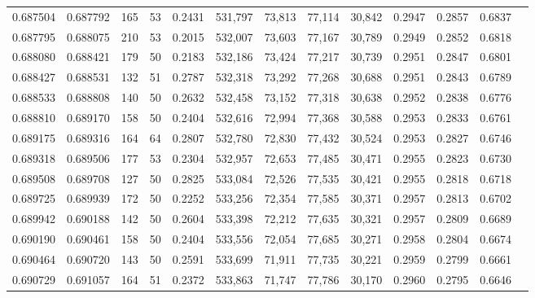 \begin{tabular}{rrrrrrrrrrrrr}
0.687504 & 0.687792 &   165 &  53 &                                     0.2431 & 531,797 &  73,813 &  77,114 &  30,842 & 0.2947 & 0.2857 & 0.6837 \\
0.687795 & 0.688075 &   210 &  53 &                                     0.2015 & 532,007 &  73,603 &  77,167 &  30,789 & 0.2949 & 0.2852 & 0.6818 \\
0.688080 & 0.688421 &   179 &  50 &                                     0.2183 & 532,186 &  73,424 &  77,217 &  30,739 & 0.2951 & 0.2847 & 0.6801 \\
0.688427 & 0.688531 &   132 &  51 &                                     0.2787 & 532,318 &  73,292 &  77,268 &  30,688 & 0.2951 & 0.2843 & 0.6789 \\
0.688533 & 0.688808 &   140 &  50 &                                     0.2632 & 532,458 &  73,152 &  77,318 &  30,638 & 0.2952 & 0.2838 & 0.6776 \\
0.688810 & 0.689170 &   158 &  50 &                                     0.2404 & 532,616 &  72,994 &  77,368 &  30,588 & 0.2953 & 0.2833 & 0.6761 \\
0.689175 & 0.689316 &   164 &  64 &                                     0.2807 & 532,780 &  72,830 &  77,432 &  30,524 & 0.2953 & 0.2827 & 0.6746 \\
0.689318 & 0.689506 &   177 &  53 &                                     0.2304 & 532,957 &  72,653 &  77,485 &  30,471 & 0.2955 & 0.2823 & 0.6730 \\
0.689508 & 0.689708 &   127 &  50 &                                     0.2825 & 533,084 &  72,526 &  77,535 &  30,421 & 0.2955 & 0.2818 & 0.6718 \\
0.689725 & 0.689939 &   172 &  50 &                                     0.2252 & 533,256 &  72,354 &  77,585 &  30,371 & 0.2957 & 0.2813 & 0.6702 \\
0.689942 & 0.690188 &   142 &  50 &                                     0.2604 & 533,398 &  72,212 &  77,635 &  30,321 & 0.2957 & 0.2809 & 0.6689 \\
0.690190 & 0.690461 &   158 &  50 &                                     0.2404 & 533,556 &  72,054 &  77,685 &  30,271 & 0.2958 & 0.2804 & 0.6674 \\
0.690464 & 0.690720 &   143 &  50 &                                     0.2591 & 533,699 &  71,911 &  77,735 &  30,221 & 0.2959 & 0.2799 & 0.6661 \\
0.690729 & 0.691057 &   164 &  51 &                                     0.2372 & 533,863 &  71,747 &  77,786 &  30,170 & 0.2960 & 0.2795 & 0.6646 \\

\end{tabular}
